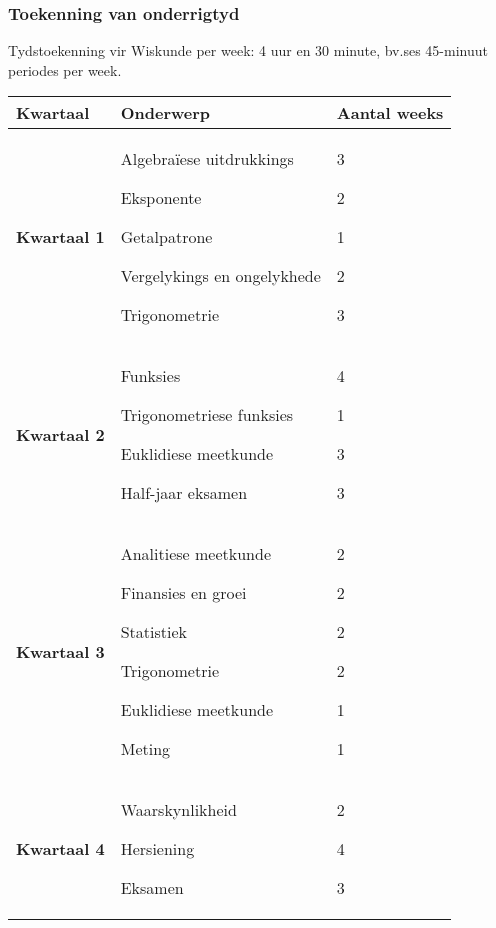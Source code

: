 \subsubsection{Toekenning van onderrigtyd}
Tydstoekenning vir Wiskunde per week: 4 uur en 30 minute, bv.\@ ses 45-minuut periodes per week.
\begin{table}[H]
 \begin{center} 
\begin{tabular}{|p{2cm}|p{6cm}|p{2cm}|} \hline
\textbf{Kwartaal}& \textbf{Onderwerp} & \textbf{Aantal weeks} \\ \hline  
\textbf{Kwartaal 1} & Algebra\"{i}ese uitdrukkings \par
Eksponente\par
Getalpatrone \par
Vergelykings en ongelykhede\par
Trigonometrie

&
3\par
2\par
1\par
2\par
3 \\ \hline
\textbf{Kwartaal 2} & Funksies \par
Trigonometriese funksies  \par
Euklidiese meetkunde  \par
Half-jaar eksamen &
4  \par
1 \par
3  \par
3  \\ \hline

\textbf{Kwartaal 3} & Analitiese meetkunde \par
Finansies en groei \par
Statistiek \par
Trigonometrie \par
Euklidiese meetkunde\par
Meting &
2 \par
2\par
2\par
2\par
1\par
1 \\ \hline
\textbf{Kwartaal 4} & Waarskynlikheid \par Hersiening \par Eksamen &
2 \par 
4 \par 
3 \\ \hline


 \end{tabular}
\end{center}
\end{table}


